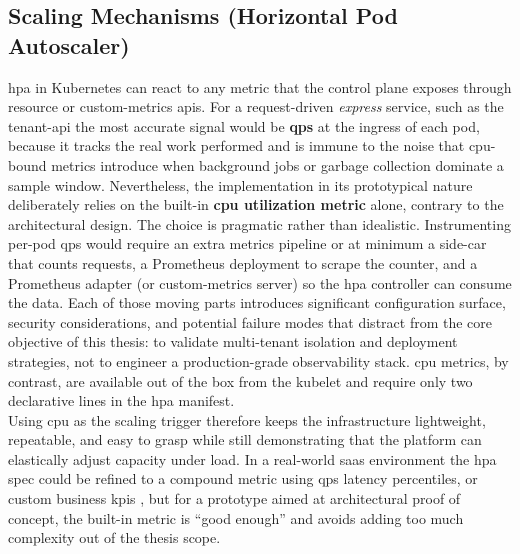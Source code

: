 \documentclass[11pt, a4paper, oneside, listof=totoc]{scrartcl}
\begin{document}
        \subsection[Scaling Mechanisms]{Scaling Mechanisms (Horizontal Pod Autoscaler)}\label{subsec:scaling}
            \gls{hpa} in Kubernetes can react to any metric that the control plane exposes through
            resource or custom-metrics \glspl{api}.
            For a request-driven \textit{express} service, such as the tenant-\gls{api} the most
            accurate signal would be \textbf{\gls{qps}} at the ingress of each pod, because it
            tracks the real work performed and is immune to the noise that \gls{cpu}-bound metrics
            introduce when background jobs or garbage collection dominate a sample window.
            Nevertheless, the implementation in its prototypical nature deliberately relies on the
            built-in \textbf{\gls{cpu} utilization metric} alone, contrary to the architectural
            design.
            The choice is pragmatic rather than idealistic.
            Instrumenting per-pod \gls{qps} would require an extra metrics pipeline or at minimum a
            side-car that counts requests, a Prometheus deployment to scrape the counter, and a
            Prometheus adapter (or custom-metrics server) so the \gls{hpa} controller can consume
            the data.
            Each of those moving parts introduces significant configuration surface, security
            considerations, and potential failure modes that distract from the core objective of
            this thesis: to validate multi-tenant isolation and deployment strategies, not to
            engineer a production-grade observability stack.
            \gls{cpu} metrics, by contrast, are available out of the box from the kubelet and
            require only two declarative lines in the \gls{hpa} manifest.
            \\
            Using \gls{cpu} as the scaling trigger therefore keeps the infrastructure lightweight,
            repeatable, and easy to grasp while still demonstrating that the platform can
            elastically adjust capacity under load.
            In a real-world \gls{saas} environment the \gls{hpa} spec could be refined to a compound
            metric using \gls{qps} latency percentiles, or custom business \glspl{kpi}
            , but for a prototype aimed at architectural proof of concept, the
            built-in metric is \enquote{good enough} and avoids adding too much complexity out of
            the thesis scope.
\end{document}
